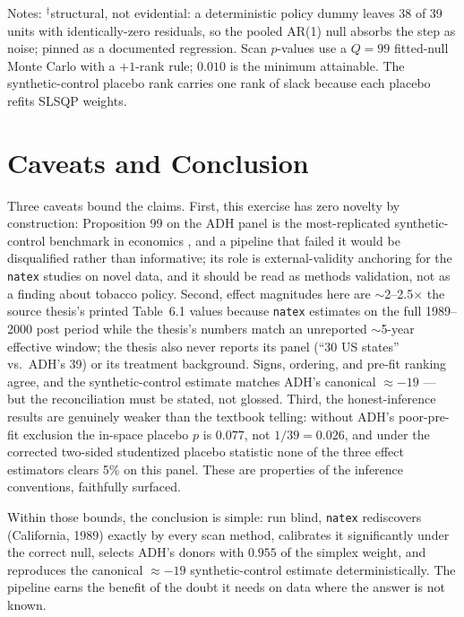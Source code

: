 \documentclass[11pt]{article}
\newcommand{\natex}{\texttt{natex}}
\begin{document}
\begin{table}[t]
\medskip
\parbox{0.95\textwidth}{\scriptsize Notes: $^{\dagger}$structural, not
evidential: a deterministic policy dummy leaves 38 of 39 units with
identically-zero residuals, so the pooled AR(1) null absorbs the step as
noise; pinned as a documented regression. Scan $p$-values use a $Q = 99$
fitted-null Monte Carlo with a $+1$-rank rule; $0.010$ is the minimum
attainable. The synthetic-control placebo rank carries one rank of slack
because each placebo refits SLSQP weights.}
\end{table}

\section{Caveats and Conclusion}\label{sec:conclusion}

Three caveats bound the claims. First, this exercise has zero novelty by
construction: Proposition 99 on the ADH panel is the most-replicated
synthetic-control benchmark in economics \cite{abadie2010,abadie2021}, and a
pipeline that failed it would be disqualified rather than informative; its
role is external-validity anchoring for the \natex{} studies on novel data,
and it should be read as methods validation, not as a finding about tobacco
policy. Second, effect magnitudes here are $\sim$2--2.5$\times$ the source
thesis's printed Table~6.1 values because \natex{} estimates on the full
1989--2000 post period while the thesis's numbers match an unreported
$\sim$5-year effective window; the thesis also never reports its panel (``30
US states'' vs.\ ADH's 39) or its treatment background. Signs, ordering, and
pre-fit ranking agree, and the synthetic-control estimate matches ADH's
canonical $\approx -19$ --- but the reconciliation must be stated, not
glossed. Third, the honest-inference results are genuinely weaker than the
textbook telling: without ADH's poor-pre-fit exclusion the in-space placebo
$p$ is $0.077$, not $1/39 = 0.026$, and under the corrected two-sided
studentized placebo statistic none of the three effect estimators clears 5\%
on this panel. These are properties of the inference conventions, faithfully
surfaced.

Within those bounds, the conclusion is simple: run blind, \natex{}
rediscovers (California, 1989) exactly by every scan method, calibrates it
significantly under the correct null, selects ADH's donors with $0.955$ of
the simplex weight, and reproduces the canonical $\approx -19$
synthetic-control estimate deterministically. The pipeline earns the benefit
of the doubt it needs on data where the answer is not known.
\end{document}
